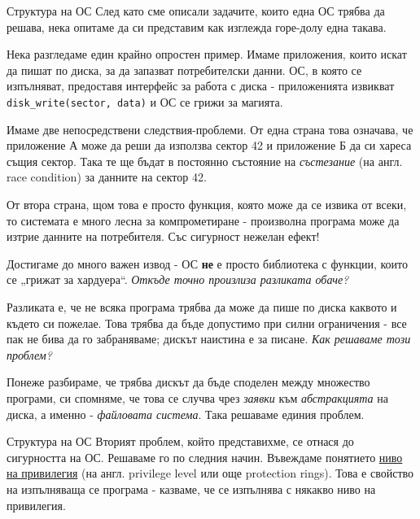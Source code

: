 \documentclass[14pt, aspectratio=169]{beamer}
\begin{document}
\begin{frame}[allowframebreaks]{Структура на ОС}
  След като сме описали задачите, които една ОС трябва да решава, нека опитаме
  да си представим как изглежда горе-долу една такава.

  Нека разгледаме един крайно опростен пример. Имаме приложения, които искат
  да пишат по диска, за да запазват потребителски данни. ОС, в която се
  изпълняват, предоставя интерфейс за работа с диска - приложенията извикват
  \texttt{disk\_write(sector, data)} и ОС се грижи за магията.

  Имаме две непосредствени следствия-проблеми. От една страна това означава,
  че приложение А може да реши да използва сектор 42 и приложение Б да си
  хареса същия сектор. Така те ще бъдат в постоянно състояние на
  \emph{състезание} (на англ. race condition) за данните на сектор 42.

  От втора страна, щом това е просто функция, която може да се извика от
  всеки, то системата е много лесна за компрометиране - произволна програма
  може да изтрие данните на потребителя. Със сигурност нежелан ефект!

  Достигаме до много важен извод - ОС \textbf{не} е просто библиотека с
  функции, които се „грижат за хардуера“. \emph{Откъде точно произлиза
    разликата обаче?}

  \framebreak

  Разликата е, че не всяка програма трябва да може да пише по диска каквото и
  където си пожелае. Това трябва да бъде допустимо при силни ограничения - все
  пак не бива да го забраняваме; дискът наистина е за писане. \emph{Как
    решаваме този проблем?}

  \bigskip
  Понеже разбираме, че трябва дискът да бъде споделен между множество
  програми, си спомняме, че това се случва чрез \emph{заявки} към
  \emph{абстракцията} на диска, а именно - \emph{файловата система}. Така
  решаваме единия проблем.
\end{frame}

\begin{frame}{Структура на ОС}
  Вторият проблем, който представихме, се отнася до сигурността на ОС.
  Решаваме го по следния начин. Въвеждаме понятието \underline{ниво на
    привилегия} (на англ. privilege level или още protection rings). Това е
  свойство на изпълняваща се програма - казваме, че се изпълнява с някакво
  ниво на привилегия.
\end{frame}
\end{document}

